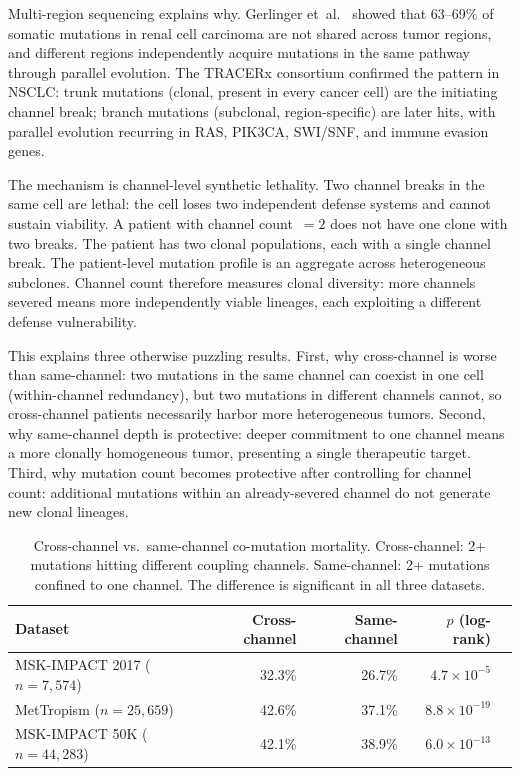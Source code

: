 \documentclass[11pt]{article}
\begin{document}
Multi-region sequencing explains why. Gerlinger et~al.\
\cite{Gerlinger2012} showed that 63--69\% of somatic mutations in
renal cell carcinoma are not shared across tumor regions, and
different regions independently acquire mutations in the same
pathway through parallel evolution. The TRACERx consortium
\cite{JamalHanjani2017, Swanton2023} confirmed the pattern in
NSCLC: trunk mutations (clonal, present in every cancer cell) are
the initiating channel break; branch mutations (subclonal,
region-specific) are later hits, with parallel evolution recurring
in RAS, PIK3CA, SWI/SNF, and immune evasion genes.

The mechanism is channel-level synthetic lethality. Two channel
breaks in the same cell are lethal: the cell loses two independent
defense systems and cannot sustain viability. A patient with
channel count~$= 2$ does not have one clone with two breaks. The
patient has two clonal populations, each with a single channel
break. The patient-level mutation profile is an aggregate across
heterogeneous subclones. Channel count therefore measures clonal
diversity: more channels severed means more independently viable
lineages, each exploiting a different defense vulnerability.

This explains three otherwise puzzling results. First, why
cross-channel is worse than same-channel: two mutations in the
same channel can coexist in one cell (within-channel redundancy),
but two mutations in different channels cannot, so cross-channel
patients necessarily harbor more heterogeneous tumors. Second, why
same-channel depth is protective: deeper commitment to one channel
means a more clonally homogeneous tumor, presenting a single
therapeutic target. Third, why mutation count becomes protective
after controlling for channel count: additional mutations within an
already-severed channel do not generate new clonal lineages.

\begin{table}[ht]
\centering
\small
\caption{Cross-channel vs.\ same-channel co-mutation mortality.
Cross-channel: 2+ mutations hitting different coupling channels.
Same-channel: 2+ mutations confined to one channel. The difference
is significant in all three datasets.}
\label{tab:cross-channel}
\begin{tabular}{@{}lrrrl@{}}
\toprule
Dataset & Cross-channel & Same-channel & $p$ (log-rank) \\
\midrule
MSK-IMPACT 2017 ($n=7{,}574$) & 32.3\% & 26.7\% &
  $4.7 \times 10^{-5}$ \\
MetTropism ($n=25{,}659$) & 42.6\% & 37.1\% &
  $8.8 \times 10^{-19}$ \\
MSK-IMPACT 50K ($n=44{,}283$) & 42.1\% & 38.9\% &
  $6.0 \times 10^{-13}$ \\
\bottomrule
\end{tabular}
\end{table}
\end{document}
